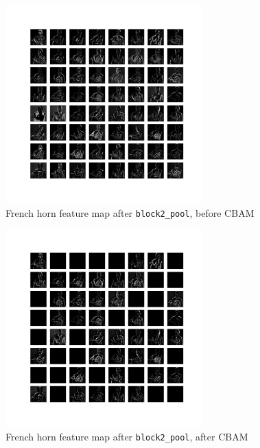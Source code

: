 \documentclass{article}
\begin{document}
\begin{appendices}
\begin{figure}[H]
    \centering
    \includegraphics[width=3in]{csci-8920/hw-4/images/horn-pre-CBAM-6-block2_pool.png}
    \caption{French horn feature map after \lstinline{block2_pool}, before CBAM}
    \label{fig:horn_2_post}
\end{figure}
\begin{figure}[H]
    \centering
    \includegraphics[width=3in]{csci-8920/hw-4/images/horn-post-CBAM-6-block2_pool.png}
    \caption{French horn feature map after \lstinline{block2_pool}, after CBAM}
    \label{fig:horn_3_pre}
\end{figure}


\end{appendices}
\end{document}
